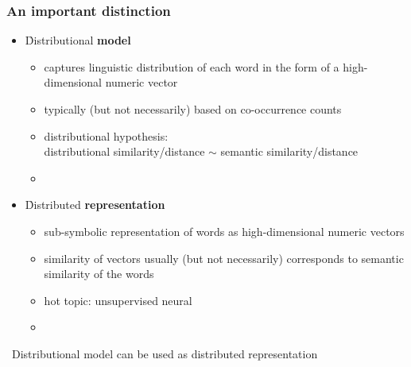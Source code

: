 \documentclass[t]{beamer} %
\begin{document}
\begin{frame}
  \frametitle{An important distinction}

  \begin{itemize}
  \item<1-> \h{Distributional} \textbf{model}
    \begin{itemize}
    \item captures linguistic distribution of each word in the form of a high-dimensional numeric vector
    \item typically (but not necessarily) based on co-occurrence counts
    \item distributional hypothesis:\\
      distributional similarity/distance $\sim$ semantic similarity/distance
    \item[]
    \end{itemize}
  \item<2-> \h{Distributed} \textbf{representation}
    \begin{itemize}
    \item sub-symbolic representation of words as high-dimensional numeric vectors
    \item similarity of vectors usually (but not necessarily) corresponds to semantic similarity of the words
    \item hot topic: unsupervised neural 
    \item[]
    \end{itemize}
  \end{itemize}
  
  \hand\ Distributional model can be used as distributed representation

\end{frame}
\end{document}

